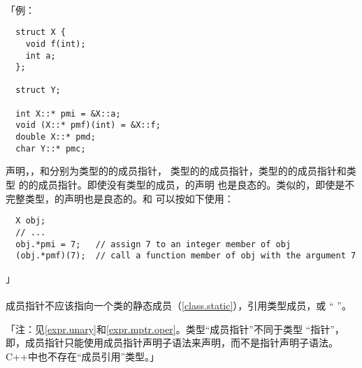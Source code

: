 \paragraph{}
「例：
\begin{lstlisting}
  struct X {
    void f(int);
    int a;
  };

  struct Y;

  int X::* pmi = &X::a;
  void (X::* pmf)(int) = &X::f;
  double X::* pmd;
  char Y::* pmc;
\end{lstlisting}
声明，，和分别为类型的的成员指针，
类型的的成员指针，类型的的成员指针和类型
的的成员指针。即使没有类型的成员，的声明
也是良态的。类似的，即使是不完整类型，的声明也是良态的。和
可以按如下使用：
\begin{lstlisting}
  X obj;
  // ...
  obj.*pmi = 7;   // assign 7 to an integer member of obj
  (obj.*pmf)(7);  // call a function member of obj with the argument 7
\end{lstlisting}」

\paragraph{}
成员指针不应该指向一个类的静态成员（\ref{class.static}），引用类型成员，或
`` ''。

「注：见\ref{expr.unary}和\ref{expr.mptr.oper}。类型``成员指针''不同于类型
``指针''，即，成员指针只能使用成员指针声明子语法来声明，而不是指针声明子语法。
C++中也不存在``成员引用''类型。」

